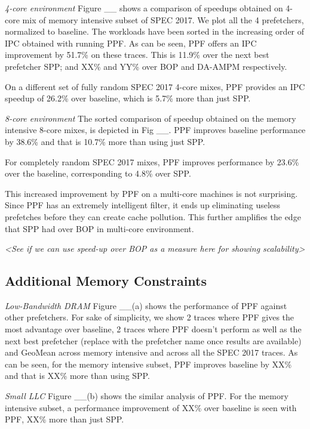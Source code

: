 \textit{4-core environment} Figure \_\_ shows a comparison of speedups
obtained on 4-core mix of memory intensive subset of SPEC 2017.  We
plot all the 4 prefetchers, normalized to baseline.  The workloads
have been sorted in the increasing order of IPC obtained with running PPF.
As can be seen,
PPF offers an IPC improvement by 51.7\% on these traces.  This is
11.9\% over the next best prefetcher SPP; and XX\% and YY\% over BOP
and DA-AMPM respectively.

On a different set of fully random SPEC 2017 4-core mixes, PPF provides an IPC speedup of 
26.2\% over baseline, which is 5.7\% more than just SPP.

\textit{8-core environment} The sorted comparison of speedup obtained 
on the memory intensive 8-core mixes, is depicted in Fig \_\_.
PPF improves baseline performance by 38.6\% and that is 10.7\% 
more than using just SPP.

For completely random SPEC 2017 mixes, PPF improves performance by 
23.6\% over the baseline, corresponding to 4.8\% over SPP.

This increased improvement by PPF on a multi-core machines is not
surprising.  Since PPF has an extremely intelligent filter, it ends up 
eliminating useless prefetches before they can create cache
pollution. This further amplifies the edge that SPP had over BOP in multi-core environment.
 
\textit{<See if we can use
speed-up over BOP as a measure here for showing scalability>}

\subsection{Additional Memory Constraints}
\label{Results-AdditionalMem}

\textit{Low-Bandwidth DRAM}
Figure \_\_(a) shows the performance of PPF against other prefetchers. 
For sake of simplicity, we show 2 traces where PPF gives the most advantage
over baseline, 2 traces where PPF doesn't perform as well as the next
best prefetcher (replace with the prefetcher name once results are
available) and GeoMean across memory intensive and across all the 
SPEC 2017 traces. As can be seen, for the memory intensive subset,
 PPF improves baseline by XX\% and that is XX\% more than using SPP.

\textit{Small LLC}
Figure \_\_(b) shows the similar analysis of PPF.
For the memory intensive subset, a performance improvement of XX\% 
over baseline is seen with PPF, XX\% more than just SPP.



